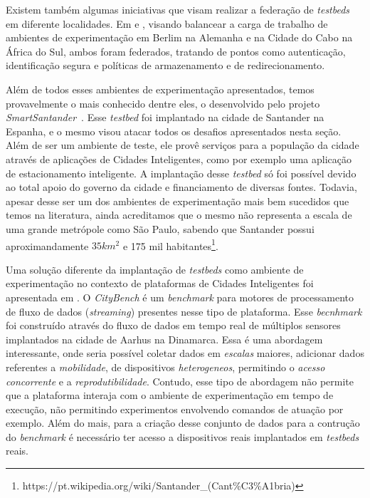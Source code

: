 Existem também algumas iniciativas que visam realizar a federação de \textit{testbeds} em diferente localidades.
Em \cite{mwangama_2013} e \cite{corici_2014}, visando balancear a carga de trabalho de ambientes de experimentação em Berlim na Alemanha e na Cidade do Cabo na África do Sul, ambos foram federados,
tratando de pontos como autenticação, identificação segura e políticas de armazenamento e de redirecionamento.

Além de todos esses ambientes de experimentação apresentados, temos provavelmente o mais conhecido dentre eles, o desenvolvido pelo projeto \textit{SmartSantander}~\cite{sanchez_2014}.
Esse \textit{testbed} foi implantado na cidade de Santander na Espanha, e o mesmo visou atacar todos os desafios apresentados nesta seção.
Além de ser um ambiente de teste, ele provê serviços para a população da cidade através de aplicações de Cidades Inteligentes, como por exemplo uma aplicação de estacionamento inteligente.
A implantação desse \textit{testbed} só foi possível devido ao total apoio do governo da cidade e financiamento de diversas fontes.
Todavia, apesar desse ser um dos ambientes de experimentação mais bem sucedidos que temos na literatura, ainda acreditamos que o mesmo não representa a escala de uma grande metrópole como
São Paulo, sabendo que Santander possui aproximandamente $ 35 km^2 $ e 175 mil habitantes\footnote{https://pt.wikipedia.org/wiki/Santander\_(Cant\%C3\%A1bria)}.

Uma solução diferente da implantação de \textit{testbeds} como ambiente de experimentação no contexto de plataformas de Cidades Inteligentes foi apresentada em \cite{ali_2015}.
O \textit{CityBench} é um \textit{benchmark} para motores de processamento de fluxo de dados (\textit{streaming}) presentes nesse tipo de plataforma.
Esse \textit{becnhmark} foi construído através do fluxo de dados em tempo real de múltiplos sensores implantados na cidade de Aarhus na Dinamarca.
Essa é uma abordagem interessante, onde seria possível coletar dados em \textit{escalas} maiores, adicionar dados referentes a \textit{mobilidade}, de dispositivos \textit{heterogeneos}, permitindo
o \textit{acesso concorrente} e a \textit{reprodutibilidade}.
Contudo, esse tipo de abordagem não permite que a plataforma interaja com o ambiente de experimentação em tempo de execução, não permitindo experimentos envolvendo comandos de atuação por exemplo.
Além do mais, para a criação desse conjunto de dados para a contrução do \textit{benchmark} é necessário ter acesso a dispositivos reais implantados em \textit{testbeds} reais.


